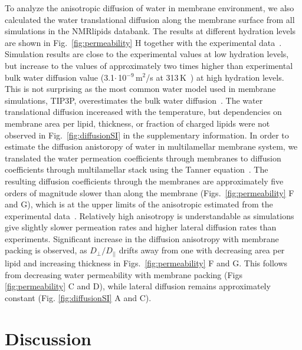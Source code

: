 \documentclass[fleqn,10pt]{wlscirep}
\begin{document}
To analyze the anisotropic diffusion of water in membrane environment, we also calculated the water translational diffusion along the membrane surface from all simulations in the NMRlipids databank. The results at different hydration levels are shown in Fig.~\ref{fig:permeability} H together with the experimental data~\cite{rudakova04}. 
Simulation results are close to the experimental values at low hydration levels, but increase to the values of approximately two times higher than experimental bulk water diffusion value (3.1$\cdot$\,10$^{-9}$\,m$^2$/s at 313\,K~\cite{khakimov08}) at high hydration levels. 
This is not surprising as the most common water model used in membrane simulations, TIP3P, overestimates the bulk water diffusion~\cite{??}. The water translational diffusion incereased with the temperature, but dependencies on membrane area per lipid, thickness, or fraction of charged lipids were not observed in Fig.~\ref{fig:diffusionSI} in the supplementary information. In order to estimate the diffusion anistoropy of water in multilamellar membrane system, we translated the water permeation coefficients through membranes to diffusion coefficients through multilamellar stack using the Tanner equation~\cite{??}. The resulting diffusion coefficients through the membranes are approximately five orders of magnitude slower than along the membrane (Figs.~\ref{fig:permeability} F and G), which is at the upper limits of the anisotropic estimated from the experimental data~\cite{nitsche19}. Relatively high anisotropy is understandable as simulations give slightly slower permeation rates and higher lateral diffusion rates than experiments. Significant increase in the diffusion anisotropy with membrane packing is observed, as $D_{\perp}/D_{||}$ drifts away from one with decreasing area per lipid and increasing thickness in Figs.~\ref{fig:permeability} F and G.
This follows from decreasing water permeability with membrane packing (Figs \ref{fig:permeability} C and D), while lateral diffusion remains approximately constant (Fig. \ref{fig:diffusionSI} A and C). 

\section{Discussion}
\end{document}

